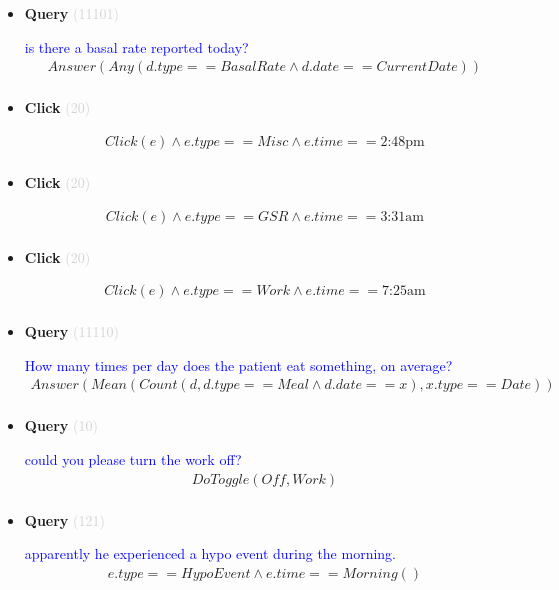 \documentclass[11pt]{article}
\newcommand{\key}[1]{\textcolor{lightgray}{#1}}
\newcounter{CQuery}
\newcounter{CClick}
\begin{document}
\begin{itemize}
\item
\textbf{Query\theCQuery} \key{(11101)} \addtocounter{CQuery}{1}
\textcolor{blue}{ is there a basal rate reported today? }
\begin{multline*}
Answer(Any(d.type==BasalRate \wedge d.date==CurrentDate)) \\ 
\end{multline*}


\item
\textbf{Click\theCClick} \key{(20)} \addtocounter{CClick}{1}
\textcolor{blue}{  }
\begin{multline*}
Click(e) \wedge e.type==Misc \wedge e.time==\mbox{2:48pm} \\ 
\end{multline*}


\item
\textbf{Click\theCClick} \key{(20)} \addtocounter{CClick}{1}
\textcolor{blue}{  }
\begin{multline*}
Click(e) \wedge e.type==GSR \wedge e.time==\mbox{3:31am} \\ 
\end{multline*}


\item
\textbf{Click\theCClick} \key{(20)} \addtocounter{CClick}{1}
\textcolor{blue}{  }
\begin{multline*}
Click(e) \wedge e.type==Work \wedge e.time==\mbox{7:25am} \\ 
\end{multline*}


\item
\textbf{Query\theCQuery} \key{(11110)} \addtocounter{CQuery}{1}
\textcolor{blue}{ How many times per day does the patient eat something, on average? }
\begin{multline*}
Answer(Mean(Count(d, d.type==Meal \wedge d.date==x), x.type==Date)) \\ 
\end{multline*}


\item
\textbf{Query\theCQuery} \key{(10)} \addtocounter{CQuery}{1}
\textcolor{blue}{ could you please turn the work off? }
\begin{multline*}
DoToggle(Off, Work) \\ 
\end{multline*}


\item
\textbf{Query\theCQuery} \key{(121)} \addtocounter{CQuery}{1}
\textcolor{blue}{ apparently he experienced a hypo event during the morning. }
\begin{multline*}
e.type==HypoEvent \wedge e.time==Morning() \\ 
\end{multline*}



\end{itemize}
\end{document}
